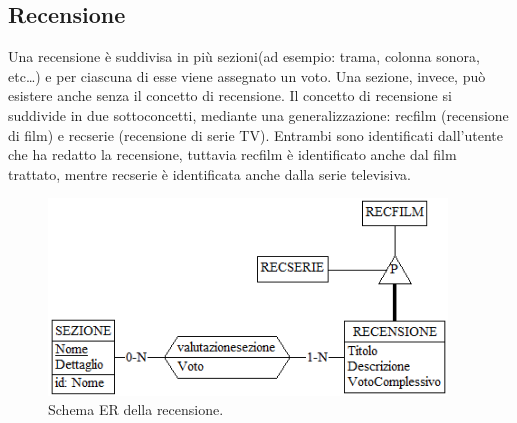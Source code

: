 \documentclass[a4paper,12pt]{report}
\begin{document}
\subsection{Recensione}
Una recensione è suddivisa in più sezioni(ad esempio: trama, colonna sonora, etc\dots) e per ciascuna di esse viene assegnato un voto. Una sezione, invece, può esistere anche senza il concetto di recensione.
Il concetto di recensione si suddivide in due sottoconcetti, mediante una generalizzazione: recfilm (recensione di film) e recserie (recensione di serie TV). Entrambi sono identificati dall'utente che ha redatto la recensione, tuttavia recfilm è identificato anche dal film trattato, mentre recserie è identificata anche dalla serie televisiva.
\begin{figure}[H]
	\centering
	\includegraphics[width=300pt]{ER/recensione.png}
	\caption{Schema ER della recensione.}
\end{figure}
\end{document}
